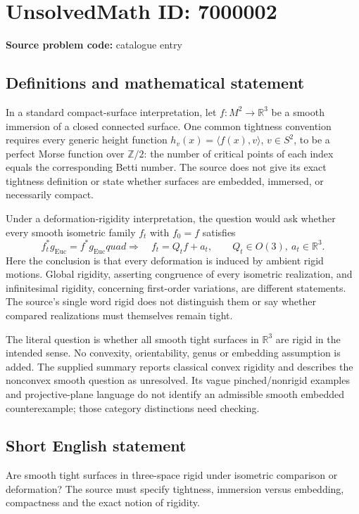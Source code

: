 \documentclass[11pt]{article}
\newcommand{\Z}{\mathbb{Z}}
\newcommand{\R}{\mathbb{R}}
\begin{document}
\section*{UnsolvedMath ID: 7000002}
\textbf{Source problem code:} catalogue entry
\subsection{Definitions and mathematical statement}
In a standard compact-surface interpretation, let $f:M^2\to\R^3$ be a smooth immersion of a closed connected surface. One common tightness convention requires every generic height function $h_v(x)=\langle f(x),v\rangle$, $v\in S^2$, to be a perfect Morse function over $\Z/2$: the number of critical points of each index equals the corresponding Betti number. The source does not give its exact tightness definition or state whether surfaces are embedded, immersed, or necessarily compact.

Under a deformation-rigidity interpretation, the question would ask whether every smooth isometric family $f_t$ with $f_0=f$ satisfies
\[
f_t^*g_{\mathrm{Euc}}=f^*g_{\mathrm{Euc}}quad\Longrightarrow\quad
f_t=Q_t f+a_t,
\qquad Q_t\in O(3),\ a_t\in\R^3.
\]
Here the conclusion is that every deformation is induced by ambient rigid motions. Global rigidity, asserting congruence of every isometric realization, and infinitesimal rigidity, concerning first-order variations, are different statements. The source's single word rigid does not distinguish them or say whether compared realizations must themselves remain tight.

The literal question is whether all smooth tight surfaces in $\R^3$ are rigid in the intended sense. No convexity, orientability, genus or embedding assumption is added. The supplied summary reports classical convex rigidity and describes the nonconvex smooth question as unresolved. Its vague pinched/nonrigid examples and projective-plane language do not identify an admissible smooth embedded counterexample; those category distinctions need checking.
\subsection{Short English statement}
Are smooth tight surfaces in three-space rigid under isometric comparison or deformation? The source must specify tightness, immersion versus embedding, compactness and the exact notion of rigidity.
\end{document}
